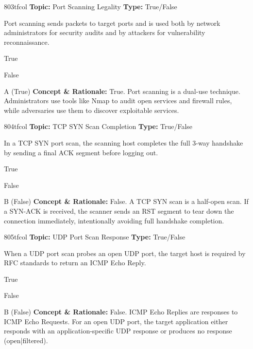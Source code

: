 \begin{qcard}{803}{tfcol}
\textcolor{darkslate!75}{\small\textbf{Topic:} Port Scanning Legality \hfill \textbf{Type:} True/False}\vspace{0.4em}\par
Port scanning sends packets to target ports and is used both by network administrators for security audits and by attackers for vulnerability reconnaissance.
\begin{qoptions}
\item True
\item False
\end{qoptions}
\end{qcard}
\nopagebreak
\begin{explainbox}{A (True)}
\textbf{Concept \& Rationale:} True. Port scanning is a dual-use technique. Administrators use tools like Nmap to audit open services and firewall rules, while adversaries use them to discover exploitable services.
\end{explainbox}

\begin{qcard}{804}{tfcol}
\textcolor{darkslate!75}{\small\textbf{Topic:} TCP SYN Scan Completion \hfill \textbf{Type:} True/False}\vspace{0.4em}\par
In a TCP SYN port scan, the scanning host completes the full 3-way handshake by sending a final ACK segment before logging out.
\begin{qoptions}
\item True
\item False
\end{qoptions}
\end{qcard}
\nopagebreak
\begin{explainbox}{B (False)}
\textbf{Concept \& Rationale:} False. A TCP SYN scan is a half-open scan. If a SYN-ACK is received, the scanner sends an RST segment to tear down the connection immediately, intentionally avoiding full handshake completion.
\end{explainbox}

\begin{qcard}{805}{tfcol}
\textcolor{darkslate!75}{\small\textbf{Topic:} UDP Port Scan Response \hfill \textbf{Type:} True/False}\vspace{0.4em}\par
When a UDP port scan probes an open UDP port, the target host is required by RFC standards to return an ICMP Echo Reply.
\begin{qoptions}
\item True
\item False
\end{qoptions}
\end{qcard}
\nopagebreak
\begin{explainbox}{B (False)}
\textbf{Concept \& Rationale:} False. ICMP Echo Replies are responses to ICMP Echo Requests. For an open UDP port, the target application either responds with an application-specific UDP response or produces no response (open|filtered).
\end{explainbox}

